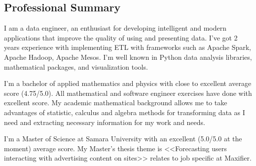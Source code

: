 \subsection*{Professional Summary}
    I am a data engineer, an enthusiast for developing intelligent and modern applications that improve the quality
    of using and presenting data. I've got 2 years experience with implementing ETL with frameworks such as
    Apache Spark, Apache Hadoop, Apache Mesos. I'm well known in Python data analysis libraries, mathematical packages,
    and visualization tools.

    I'm a bachelor of applied mathematics and physics with close to excellent average score (4.75/5.0). All mathematical
    and software engineer exercises have done with excellent score. My academic mathematical background allows me to
    take advantages of statistic, calculus and algebra methods for transforming data as I need and extracting necessary
    information for my work and needs.

    I'm a Master of Science at Samara University with an excellent (5.0/5.0 at the moment) average score. My Master's thesis theme is <<Forecasting users interacting with
    advertising content on sites>> relates to job specific at Maxifier.